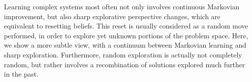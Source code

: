 Learning complex systems most often not only involves continuous Markovian improvement, but also sharp explorative perspective changes, which are equivalent to resetting beliefs. This reset is usually considered as a random move performed, in order to explore yet unknown portions of the problem space. Here, we show a more subtle view, with a continuum between Markovian learning and sharp exploration. Furthermore, random exploration is actually not completely random, but rather involves a recombination of solutions explored much further in the past.
